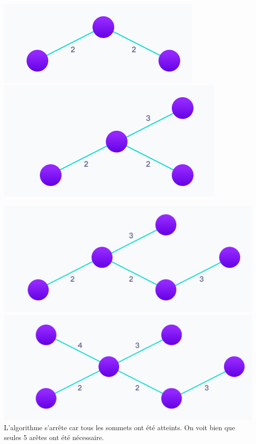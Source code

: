 \begin{Exercice}[5 minutes]
\begin{solution}
        \includegraphics[]{K2.PNG}\\
        \includegraphics[]{K3.PNG}\\
    \end{solution}
    \begin{solution}
        \includegraphics[]{K4.PNG}\\
        \includegraphics[]{K5.PNG}\\
        L'algorithme s'arrête car tous les sommets ont été atteints. On voit bien que seules 5 arêtes ont été nécessaire.
    \end{solution}
\end{Exercice}

